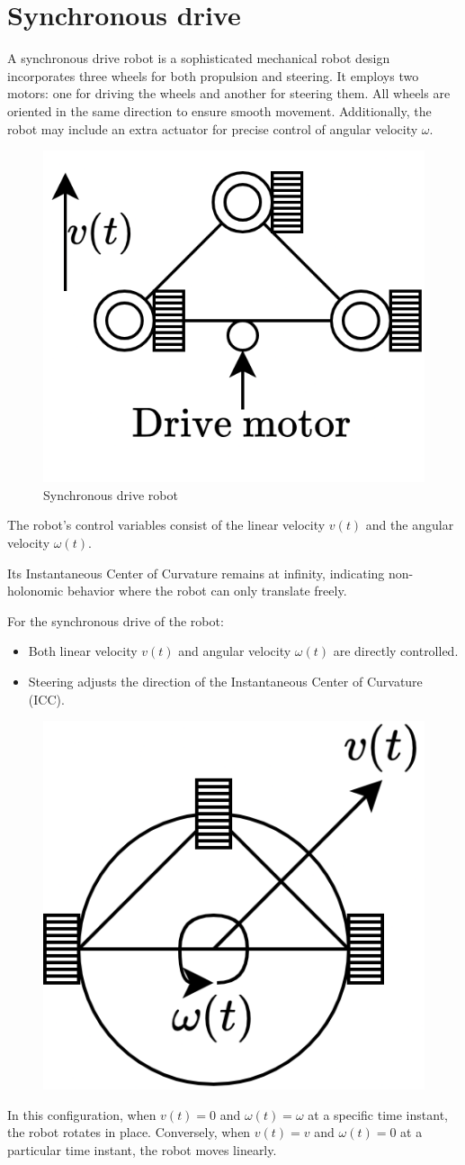 \section{Synchronous drive}

A synchronous drive robot is a sophisticated mechanical robot design incorporates three wheels for both propulsion and steering.
It employs two motors: one for driving the wheels and another for steering them. 
All wheels are oriented in the same direction to ensure smooth movement.
Additionally, the robot may include an extra actuator for precise control of angular velocity $\omega$.
\begin{figure}[H]
    \centering
    \includegraphics[width=0.25\linewidth]{images/syn.png} 
    \caption{Synchronous drive robot}
\end{figure}
The robot's control variables consist of the linear velocity $v(t)$ and the angular velocity $\omega(t)$. 

Its Instantaneous Center of Curvature remains at infinity, indicating non-holonomic behavior where the robot can only translate freely.

For the synchronous drive of the robot:
\begin{itemize}
    \item Both linear velocity $v(t)$ and angular velocity $\omega(t)$ are directly controlled.
    \item Steering adjusts the direction of the Instantaneous Center of Curvature (ICC).
\end{itemize}
\begin{figure}[H]
    \centering
    \includegraphics[width=0.25\linewidth]{images/syn1.png} 
\end{figure}
In this configuration, when $v(t)=0$ and $\omega(t)=\omega$ at a specific time instant, the robot rotates in place. 
Conversely, when $v(t)=v$ and $\omega(t)=0$ at a particular time instant, the robot moves linearly. 

